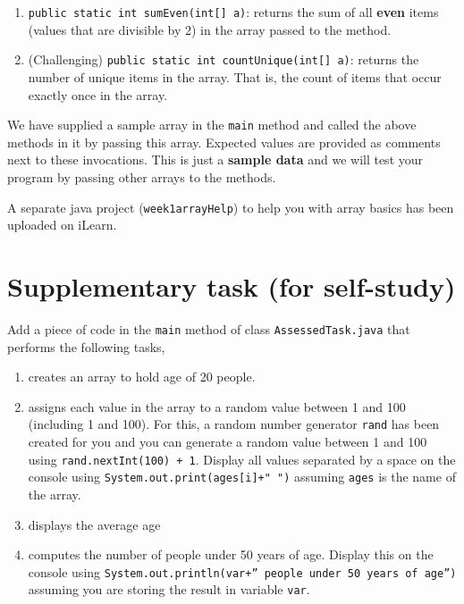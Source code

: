 \begin{questions}
\begin{enumerate}
\item \texttt{public static int sumEven(int[] a)}: returns the sum of all \textbf{even} items (values that are divisible by 2) in the array passed to the method. 

\item (Challenging) \texttt{public static int countUnique(int[] a)}: returns the number of unique items in the array. That is, the count of items that occur exactly once in the array.
\end{enumerate}

We have supplied a sample array in the \texttt{main} method and called the above methods in it by passing this array. Expected values are provided as comments next to these invocations. This is just a \textbf{sample data} and we will test your program by passing other arrays to the methods.

A separate java project (\texttt{week1arrayHelp}) to help you with array basics has been uploaded on iLearn.

\newpage

\section*{Supplementary task (for self-study)}

\question Add a piece of code in the \texttt{main} method of class \texttt{AssessedTask.java}  that performs the following tasks,

\begin{enumerate}
\item creates an array to hold age of 20 people. 

\item assigns each value in the array to a random value between 1 and 100 (including 1 and 100). For this, a random number generator \texttt{rand} has been created for you and you can generate a random value between 1 and 100 using \texttt{rand.nextInt(100) + 1}. Display all values separated by a space on the console using \texttt{System.out.print(ages[i]+" ")} assuming \texttt{ages} is the name of the array.

\item displays the average age

\item computes the number of people under 50 years of age. Display this on the console using \texttt{System.out.println(var+'' people under 50 years of age'')} assuming you are storing the result in variable \texttt{var}. 


\end{enumerate}
\end{questions}
